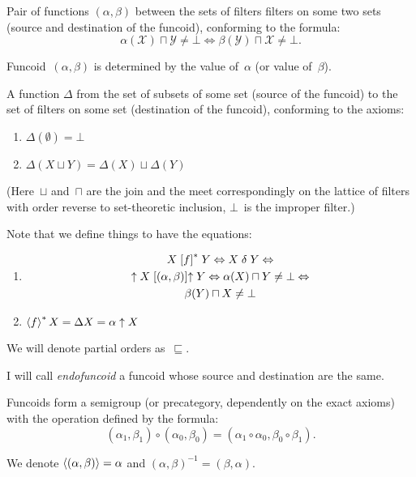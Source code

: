 Pair of functions $(\alpha,\beta)$ between the sets of filters filters on some two sets (source and destination of the funcoid), conforming to the formula:
\[ \alpha (\mathcal{X})\sqcap \mathcal{Y}\neq \bot \iff \beta (\mathcal{Y})\sqcap \mathcal{X}\neq \bot. \]

\begin{rem}
Funcoid~$(\alpha,\beta)$ is determined by the value of~$\alpha$ (or value of~$\beta$).
\end{rem}

A function $\Delta$ from the set of subsets of some set (source of the funcoid) to the set of filters on some set (destination of the funcoid), conforming to the axioms:

\begin{enumerate}
\item $\Delta (\emptyset)=\bot$
\item $\Delta (X\sqcup Y)=\Delta (X)\sqcup \Delta (Y)$
\end{enumerate}

(Here~$\sqcup$ and~$\sqcap$ are the join and the meet correspondingly on the lattice of filters with order reverse to set-theoretic inclusion, $\bot$~is the improper filter.)

Note that we define things to have the equations:
\begin{enumerate}
\item
\begin{multline*}
X\mathrel{\left[f\right]^{\ast}}Y \Leftrightarrow X\mathrel{\delta}Y \Leftrightarrow \\ \uparrow X\mathrel{\left[(\alpha,\beta)\right]}\uparrow Y \Leftrightarrow
\alpha (X)\sqcap Y\neq \bot \Leftrightarrow \\ \beta (Y)\sqcap X\neq \bot
\end{multline*}
\item $\left\langle f\right\rangle ^{\ast}X = \Delta X = \alpha\uparrow X$
\end{enumerate}

We will denote partial orders as~$\sqsubseteq$.

I will call \emph{endofuncoid} a funcoid whose source and destination are the same.

Funcoids form a semigroup (or precategory, dependently on the exact axioms) with the operation defined by the formula:
\[ (\alpha _{1},\beta _{1})\circ (\alpha _{0},\beta _{0})=(\alpha _{1}\circ \alpha _{0},\beta _{0}\circ \beta _{1}). \]

We denote $\left\langle (\alpha,\beta)\right\rangle=\alpha$ and
$(\alpha,\beta)^{-1} = (\beta,\alpha)$.


